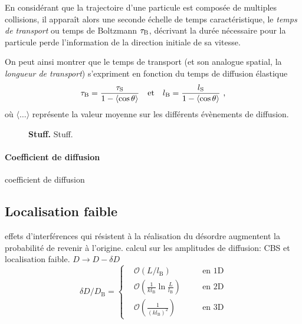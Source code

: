 En considérant que la trajectoire d'une particule est composée de multiples collisions, il apparaît alors une seconde échelle de temps caractéristique, le \emph{temps de transport} ou temps de Boltzmann $\tau_{\mathrm{B}}$, décrivant la durée nécessaire pour la particule perde l'information de la direction initiale de sa vitesse. 


On peut ainsi montrer que le temps de transport (et son analogue spatial, la \emph{longueur de transport}) s'expriment en fonction du temps de diffusion élastique \citep{akkermans2007mesoscopic}
\begin{equation}
\tau_{\mathrm{B}}=\frac{\tau_{\mathrm{S}}}{1-\left\langle\cos{\theta}\right\rangle} \quad \text{et} \quad l_{\mathrm{B}}=\frac{l_{\mathrm{S}}}{1-\left\langle\cos{\theta}\right\rangle} \text{ ,}
\end{equation}
où $\langle\dots\rangle$ représente la valeur moyenne sur les différents évènements de diffusion.


\begin{figure}
\centering

\caption{\textbf{Stuff.} Stuff.}
\label{fig:diffusion_classique}
\end{figure}

\paragraph*{Coefficient de diffusion}
coefficient de diffusion





\subsection{Localisation faible}
\label{sc:weak_localisation}
effets d'interférences qui résistent à la réalisation du désordre augmentent la probabilité de revenir à l'origine.
calcul sur les amplitudes de diffusion: CBS et localisation faible.
$D\rightarrow D-\delta D$
\begin{equation}
\delta D/ D_{\mathrm{B}} = \left\lbrace \begin{aligned}
& \mathcal{O}\left(L/l_{\mathrm{B}}\right)  \quad &&\text{en 1D}\\
& \mathcal{O}\left(\frac{1}{k l_{\mathrm{B}}} \ln{\frac{L}{l_{\mathrm{B}}}} \right) \quad &&\text{en 2D}\\
& \mathcal{O}\left(\frac{1}{(k l_{\mathrm{B}})^2}\right) \quad &&\text{en 3D}
\end{aligned}\right.
\end{equation}

